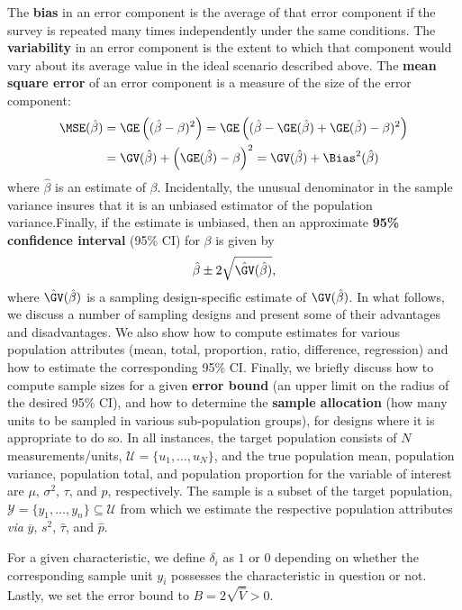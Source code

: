 The \textbf{bias} in an error component is the average of that error component if the survey is repeated many times independently under the same conditions. The \textbf{variability} in an error component is the extent to which that component would vary about its average value in the ideal scenario described above. The \textbf{mean square error} of an error component is a measure of the size of the error component:
\begin{align*}
\MSE(\hat{\beta})&=\GE\left((\hat{\beta}-\beta)^2\right)=\GE\left((\hat{\beta}-\GE(\hat{\beta})+\GE(\hat{\beta})-\beta)^2\right)\\&=\GV(\hat{\beta})+\left(\GE(\hat{\beta})-\beta\right)^2=\GV(\hat{\beta})+\Bias^2(\hat{\beta}) \end{align*}
where $\hat{\beta}$ is an estimate of $\beta$. Incidentally, the unusual denominator in the sample variance insures that it is an unbiased estimator of the population variance.\newl Finally, if the estimate is unbiased, then an approximate \textbf{95\% confidence interval} (95\% CI) for $\beta$ is given by $$\hat{\beta}\pm 2\sqrt{\hat{\GV}(\hat{\beta})},$$ where $\hat{\GV}(\hat{\beta})$ is a sampling design-specific estimate of $\GV(\hat{\beta})$.
\newl In what follows, we discuss a number of sampling designs and present some of their advantages and disadvantages. We also show how to compute estimates for various population attributes (mean, total, proportion, ratio, difference, regression) and how to estimate the corresponding 95\% CI. Finally, we briefly discuss how to compute sample sizes for a given \textbf{error bound} (an upper limit on the radius of the desired 95\% CI), and how to determine the \textbf{sample allocation} (how many units to be sampled in various sub-population groups), for designs where it is appropriate to do so. \newl 
In all instances, the target population consists of $N$ measurements/units, $\mathcal{U}=\{u_1,\ldots,u_N\}$, and the true population mean, population variance, population total, and population proportion for the variable of interest are $\mu$, $\sigma^2$, $\tau$, and $p$, respectively. The sample is a subset of the target population, $\mathcal{Y}=\{y_1,\ldots,y_n\}\subseteq \mathcal{U}$ from which we estimate the respective population attributes \textit{via} $\overline{y}$, $s^2$, $\hat{\tau}$, and $\hat{p}$. \par For a given characteristic, we define $\delta_i$ as $1$ or $0$ depending on whether the corresponding sample unit $y_i$ possesses the characteristic in question or not. Lastly, we set the error bound to $B=2\sqrt{\hat{V}}>0$.\newpage\noindent 
